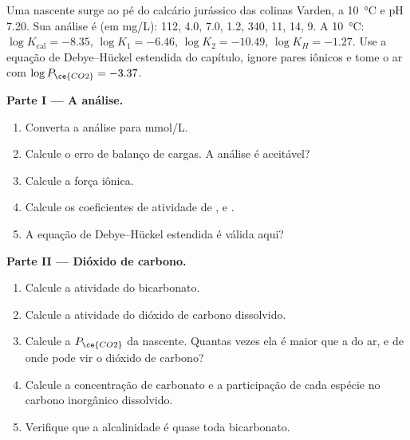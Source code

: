 \begin{problem}
\label{pb:b3:water-rock-interaction:1}
Uma nascente surge ao pé do calcário jurássico das colinas Varden, a
\qty{10}{\celsius} e pH 7.20. Sua análise é (em \unit{mg/L}): 
112,  4.0,  7.0,  1.2,  340,  11,
 14,  9. A \qty{10}{\celsius}: $\log K_{\mathrm{cal}} =
-8.35$, $\log K_1 = -6.46$, $\log K_2 = -10.49$, $\log K_H = -1.27$. Use a
equação de Debye--Hückel estendida do capítulo, ignore pares iônicos e tome
o ar com $\log P_{\ce{CO2}} = -3.37$.

\medskip\noindent\textbf{Parte I --- A análise.}
\begin{enumerate}
\item Converta a análise para \unit{mmol/L}.
\item Calcule o erro de balanço de cargas. A análise é aceitável?
\item Calcule a força iônica.
\item Calcule os coeficientes de atividade de ,  e
  .
\item A equação de Debye--Hückel estendida é válida aqui?
\end{enumerate}

\medskip\noindent\textbf{Parte II --- Dióxido de carbono.}
\begin{enumerate}[resume]
\item Calcule a atividade do bicarbonato.
\item Calcule a atividade do dióxido de carbono dissolvido.
\item Calcule a $P_{\ce{CO2}}$ da nascente. Quantas vezes ela é maior que a
  do ar, e de onde pode vir o dióxido de carbono?
\item Calcule a concentração de carbonato e a participação de cada espécie no
  carbono inorgânico dissolvido.
\item Verifique que a alcalinidade é quase toda bicarbonato.
\end{enumerate}


\end{problem}
